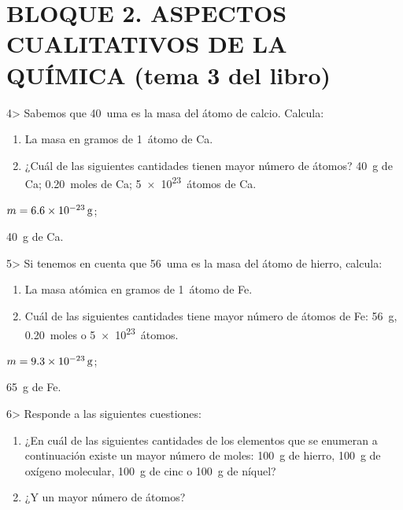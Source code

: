 \documentclass{article}
\begin{document}
\section{BLOQUE 2. ASPECTOS CUALITATIVOS DE LA QUÍMICA (tema 3 del libro)}

\begin{exercise}
4> Sabemos que \SI{40}{uma} es la masa del átomo de calcio. Calcula:
  \begin{enumerate}
    \item La masa en gramos de \SI{1}{átomo} de Ca.
    \item ¿Cuál de las siguientes cantidades tienen mayor número de átomos? \SI{40}{g} de Ca; \SI{0,20}{moles} de Ca; \SI{5e23}{átomos} de Ca.
  \end{enumerate}
\end{exercise}

\begin{solution}
  \begin{enumerate*}
    \item $m = \SI{6,6E-23}{\gram}$;
    \item \SI{40}{\gram} de Ca.
  \end{enumerate*}
\end{solution}

\begin{exercise}
  5> Si tenemos en cuenta que \SI{56}{uma} es la masa del átomo de hierro, calcula:
  \begin{enumerate}
    \item La masa atómica en gramos de \SI{1}{átomo} de Fe.
    \item Cuál de las siguientes cantidades tiene mayor número de átomos de Fe: \SI{56}{\gram}, \SI{0,20}{moles} o \SI{5e23}{átomos}.
  \end{enumerate}
\end{exercise}

\begin{solution}
  \begin{enumerate*}
    \item $m = \SI{9,3E-23}{\gram}$;
    \item \SI{65}{\gram} de Fe.
  \end{enumerate*}
\end{solution}

\begin{exercise}
  6> Responde a las siguientes cuestiones:
  \begin{enumerate}
    \item ¿En cuál de las siguientes cantidades de los elementos que se enumeran a continuación existe un mayor número de moles: \SI{100}{\gram} de hierro, \SI{100}{\gram} de oxígeno molecular, \SI{100}{\gram} de cinc o \SI{100}{\gram} de níquel?
    \item ¿Y un mayor número de átomos?
  \end{enumerate}
\end{exercise}
\end{document}
